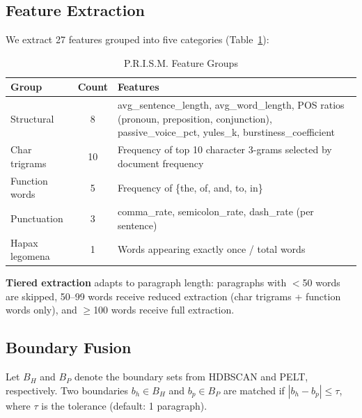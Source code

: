 \documentclass[conference]{IEEEtran}
\begin{document}

\subsection{Feature Extraction}
\label{sec:features}

We extract 27 features grouped into five categories (Table~\ref{tab:features}):

\begin{table}[htbp]
\caption{P.R.I.S.M. Feature Groups}
\begin{center}
\begin{tabular}{@{}lcp{4.5cm}@{}}
\toprule
\textbf{Group} & \textbf{Count} & \textbf{Features} \\
\midrule
Structural & 8 & avg\_sentence\_length, avg\_word\_length, POS ratios (pronoun, preposition, conjunction), passive\_voice\_pct, yules\_k, burstiness\_coefficient \\
Char trigrams & 10 & Frequency of top 10 character 3-grams selected by document frequency \\
Function words & 5 & Frequency of \{the, of, and, to, in\} \\
Punctuation & 3 & comma\_rate, semicolon\_rate, dash\_rate (per sentence) \\
Hapax legomena & 1 & Words appearing exactly once / total words \\
\bottomrule
\end{tabular}
\label{tab:features}
\end{center}
\end{table}

\textbf{Tiered extraction} adapts to paragraph length: paragraphs with $<$50 words are skipped, 50--99 words receive reduced extraction (char trigrams + function words only), and $\geq$100 words receive full extraction.

\subsection{Boundary Fusion}
\label{sec:fusion}

Let $B_H$ and $B_P$ denote the boundary sets from HDBSCAN and PELT, respectively. Two boundaries $b_h \in B_H$ and $b_p \in B_P$ are matched if $|b_h - b_p| \leq \tau$, where $\tau$ is the tolerance (default: 1 paragraph).
\end{document}
